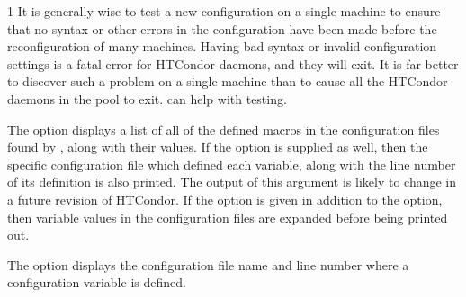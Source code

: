\begin{ManPage}{\label{man-condor-config-val}}{1}
It is generally wise to test a new configuration on a single
machine to ensure that no syntax or other errors in the
configuration have been made before the reconfiguration of many machines.  
Having bad syntax or invalid configuration settings is a fatal error
for HTCondor daemons, and they will exit.
It is far better to discover such a problem on a single machine than to
cause all the HTCondor daemons in the pool to exit.
 can help with testing.



The  option displays a list of all of the defined macros
in the configuration files found by , along with
their values. If the  option is supplied as well,
then the specific configuration file which defined each variable,
along with the line number of its definition is also printed. 
\Note The output of this argument is likely to change 
in a future revision of HTCondor.
If the  option is given in addition to the  option,
then variable values in the configuration files are expanded before
being printed out.

The  option displays the configuration
file name and line number where a configuration variable is defined.



\end{ManPage}
